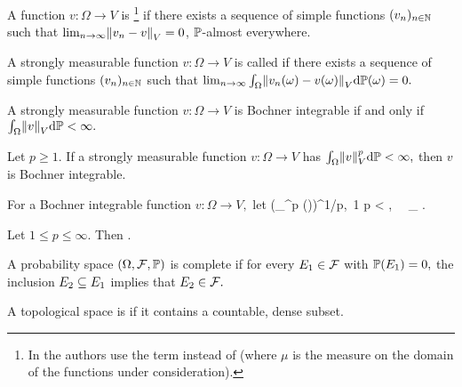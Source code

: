 \label{def:strongmeas}
A function $v:\Omega \rightarrow V$ is \footnote{In \cite{DiUh:77} the authors use the term  instead of  (where $\mu$ is the measure on the domain of the functions under consideration).} 
if there exists a sequence of simple functions $(v_{n})_{n \in \mathbb N}$ such that
$\lim_{n \rightarrow \infty} \NV{\vn - v} = 0$, %
$\mathbb P$-almost everywhere.
\ede



A strongly measurable function $v:\Omega \rightarrow V$ is called  if there exists a sequence of simple functions $(v_{n})_{n \in \mathbb N}$ such that
$\lim_{n \rightarrow \infty} \int_{\Omega} \NV{\vn(\omega) - v(\omega)} \dd\PP(\omega) = 0.$
\ede

\label{thm:bochnercond}
A strongly measurable function $v:\Omega \rightarrow V$ is Bochner integrable if and only if $\int_\Omega \NV{v} \dd\PP < \infty.$
\enth

\label{cor:bochnersimple}
Let $p \geq 1.$ If a strongly measurable function $v:\Omega \rightarrow V$ has $\int_\Omega \NV{v}^p \dd\PP < \infty,$ then $v$ is Bochner integrable.
\eco



\label{def:bochnernorm}
For a Bochner integrable function $v:\Omega\rightarrow V,$ let
\beqs
{} \de \mleft(\int_\Omega {}^p \dd\PP(\omega)\mright)^{1/p}, \,1 \leq p < \infty, \,\,\,\, \de \esssup_{\omega \in \Omega} .
\eeqs
\ede

\label{def:bochnerspace}
Let $1\leq p \leq \infty.$ Then
\beqs
\LpOV \de {}.
\eeqs
\ede

A probability space $\OFP$ is complete if for every $E_{1} \in \mathcal F$ with $\mathbb P(E_{1})=0,$ the inclusion $E_{2} \subseteq E_{1}$ implies that $E_{2} \in \mathcal F.$
\ede

A topological space is  if it contains a countable, dense subset.
\ede

